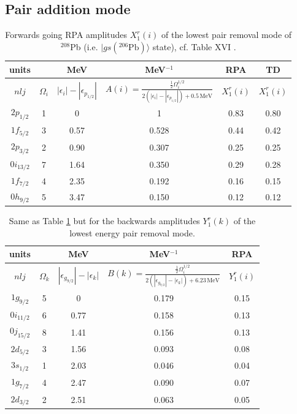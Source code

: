 \subsection{Pair addition mode}\label{S3.5.2}
\begin{table}
\begin{tabular}{|c|c|c|c|c|c|}
\hline units &  &MeV  &MeV$^{-1}$  & RPA & TD \\ 
\hline  $nlj$&$\Omega_i$  &$|\epsilon_i|-|\epsilon_{p_{1/2}}|$  &$A(i)=\frac{\frac{1}{2}\Omega_i^{1/2}}{2(|\epsilon_i|-|\epsilon_{p_{1/2}}|)+0.5\,\text{MeV}}$  & $X_1^r(i)$ & $X_1^r(i)$ \\ 
\hline  $2p_{1/2}$& 1 &  0& 1 &  0.83&  0.80\\ 
\hline $1f_{5/2}$ & 3 &  0.57&0.528  & 0.44 & 0.42 \\ 
\hline  $2p_{3/2}$& 2 &  0.90&  0.307&  0.25&  0.25\\ 
\hline  $0i_{13/2}$& 7 & 1.64 & 0.350 & 0.29 &  0.28\\ 
\hline  $1f_{7/2}$&  4& 2.35 &  0.192& 0.16 &  0.15\\ 
\hline  $0h_{9/2}$&  5& 3.47 & 0.150 &  0.12&0.12  \\ 
\hline 
\end{tabular}\caption{ Forwards going RPA amplitudes $X_1^r(i)$ of the lowest pair removal mode of $^{208}$Pb (i.e. $|gs\left(^{206}\text{Pb}\right)\rangle$ state), cf. Table XVI \cite{Broglia:73}.}\label{tab1E2}
\end{table}
\begin{table}
\begin{tabular}{|c|c|c|c|c|}
\hline units &  &MeV  &MeV$^{-1}$  &  RPA  \\ 
\hline  $nlj$&$\Omega_k$  &$|\epsilon_{g_{9/2}}|-|\epsilon_k|$  &$B(k)=\frac{\frac{1}{2}\Omega_i^{1/2}}{2(|\epsilon_{g_{9/2}}|-|\epsilon_k|)+6.23\,\text{MeV}}$  & $Y_1^r(i)$  \\ 
\hline  $1g_{9/2}$& 5 &  0& 0.179 &  0.15\\ 
\hline $0i_{11/2}$ & 6 &  0.77&0.158  & 0.13  \\ 
\hline  $0j_{15/2}$& 8 &  1.41&  0.156&  0.13\\ 
\hline  $2d_{5/2}$& 3 & 1.56 & 0.093 & 0.08 \\ 
\hline  $3s_{1/2}$&  1& 2.03 &  0.046& 0.04\\ 
\hline  $1g_{7/2}$&  4& 2.47 & 0.090 &  0.07  \\ 
\hline  $2d_{3/2}$&  2& 2.51 & 0.063 &  0.05 \\ 
\hline 
\end{tabular}\caption{ Same as Table \ref{tab1E2} but for the backwards amplitudes $Y_1^r(k)$ of the lowest energy pair removal mode.}\label{tab1E3}
\end{table}

